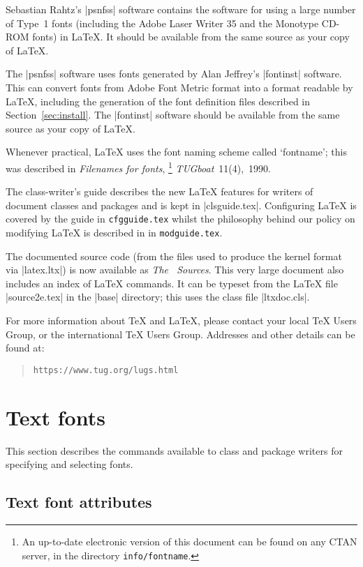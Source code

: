 \documentclass{ltxguide}[1995/11/28]
\begin{document}
Sebastian Rahtz's |psnfss| software contains the software for using a
large number of Type~1 fonts (including the Adobe Laser Writer 35 and
the Monotype CD-ROM fonts) in \LaTeX.  It should be available from the
same source as your copy of \LaTeX.

The |psnfss| software uses fonts generated by Alan Jeffrey's |fontinst|
software.  This can convert fonts from Adobe Font Metric format into a
format readable by \LaTeX, including the generation of the font
definition files described in Section~\ref{sec:install}.  The |fontinst|
software should be available from the same source as your copy of
\LaTeX.

Whenever practical, \LaTeX{} uses the font naming scheme called
`fontname'; this was described in \emph{Filenames for fonts},%
\footnote{An up-to-date electronic version of this document can be found
  on any CTAN server, in the directory \texttt{info/fontname}.}
\emph{TUGboat}~11(4),~1990.

The class-writer's guide \emph{\clsguide} describes the new \LaTeX{}
features for writers of document classes and packages and is kept in
|clsguide.tex|. Configuring \LaTeX{} is covered by the guide
\emph{\cfgguide} in \texttt{cfgguide.tex} whilst the philosophy behind
our policy on modifying \LaTeX{} is described in \emph{\modguide} in
\texttt{modguide.tex}.

The documented source code (from the files used to produce the kernel
format via |latex.ltx|) is now available as \emph{The \LaTeXe\ Sources}.
This very large document also includes an index of \LaTeX{} commands.
It can be typeset from the \LaTeX{} file |source2e.tex| in the |base|
directory; this uses the class file |ltxdoc.cls|.

For more information about \TeX{} and \LaTeX{}, please contact your
local \TeX{} Users Group, or the international \TeX{} Users Group.
Addresses and other details can be found at:
\begin{quote}\small\label{addrs}
  \texttt{https://www.tug.org/lugs.html}
\end{quote}


\section{Text fonts}
\label{sec:text}

This section describes the commands available to class and package
writers for specifying and selecting fonts.

\subsection{Text font attributes}
\label{sec:textfontattributes}
\end{document}
